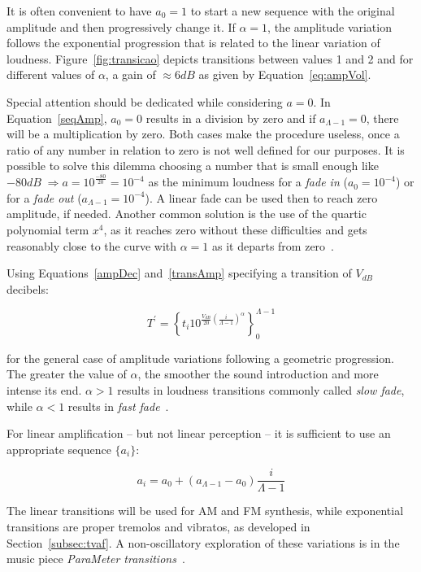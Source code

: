 It is often convenient to have $a_0=1$ to start a new sequence with the original amplitude and then progressively change it.
If $\alpha=1$, the amplitude variation follows the exponential progression that is related to the linear variation of loudness. Figure~\ref{fig:transicao} depicts transitions between values 1 and 2 and for different values of $\alpha$, a gain of $\approx 6dB$ as given by Equation~\ref{eq:ampVol}.

Special attention should be dedicated while considering $a=0$.
In Equation~\ref{seqAmp}, $a_0=0$ results in a division by zero and if $a_{\Lambda-1}=0$, there will be a multiplication by zero.
Both cases make the procedure useless, once a ratio of any number in relation to zero is not well defined for our purposes. It is possible to solve this dilemma choosing a number that is small enough like $-80dB\;\Rightarrow a=10^{\frac{-80}{20}}=10^{-4}$ as the minimum loudness for a \emph{fade in} ($a_0=10^{-4}$) or for a \emph{fade out} ($a_{\Lambda-1}=10^{-4}$). A linear fade can be used then to reach zero amplitude, if needed. Another common solution is the use of the quartic polynomial term $x^4$, as it reaches zero without these difficulties and gets reasonably close to the curve with $\alpha=1$ as it departs from zero~\cite{Cook}.

Using Equations~\ref{ampDec} and~\ref{transAmp} specifying a transition of $V_{dB}$ decibels:

\begin{equation}\label{seqAmpDB}
T^{'}=\left\{ t_i 10^{\frac{V_{dB}}{20}\left( \frac{i}{\Lambda-1} \right)^\alpha} \right\}_0^{\Lambda-1}
\end{equation}

\noindent for the general case of amplitude variations following a geometric progression. The greater the value of $\alpha$, the smoother the sound introduction and more intense its end. $\alpha>1$ results in loudness transitions commonly called \emph{slow fade}, while $\alpha<1$ results in \emph{fast fade}~\cite{guillaume}.

For linear amplification -- but not linear perception -- it is sufficient to use an appropriate sequence $\{a_i\}$:

\begin{equation}\label{seqAmpLin}
a_i=a_0 + (a_{\Lambda-1}-a_0)\frac{i}{\Lambda-1}
\end{equation}

The linear transitions will be used for AM and FM synthesis, while exponential transitions are proper tremolos and vibratos, as developed in Section~\ref{subsec:tvaf}. A non-oscillatory exploration of these variations is in the music piece \emph{ParaMeter transitions}~\cite{MASSA}.

